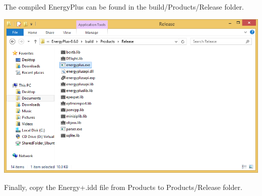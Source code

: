 \begin{DoxyEnumerate}
\item The compiled Energy\+Plus can be found in the {\ttfamily build/\+Products/\+Release} folder. 
\begin{DoxyImage}
\includegraphics[width=15cm]{vs_compilerelease3.png}
\end{DoxyImage}
  
\item Finally, copy the {\ttfamily Energy+.idd} file from {\ttfamily Products} to {\ttfamily Products/\+Release} folder.
\end{DoxyEnumerate}

 